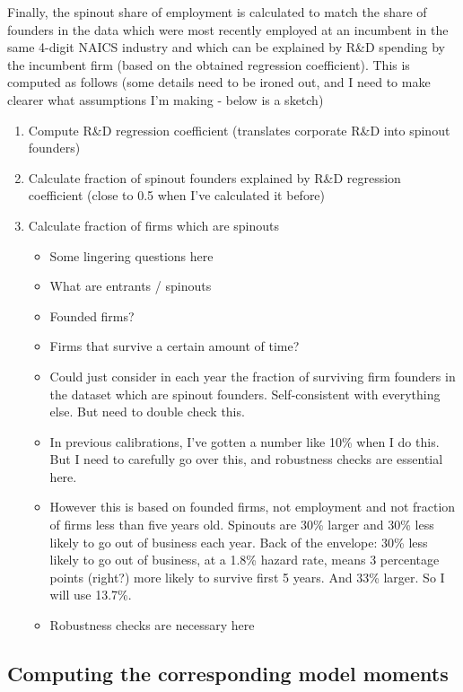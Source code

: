 \documentclass[11pt,english]{article}
\theoremstyle{remark}
\begin{document}
Finally, the spinout share of employment is calculated to match the share of founders in the data which were most recently employed at an incumbent in the same 4-digit NAICS industry and which can be explained by R\&D spending by the incumbent firm (based on the obtained regression coefficient). This is computed as follows (some details need to be ironed out, and I need to make clearer what assumptions I'm making - below is a sketch)

\footnotesize
\begin{enumerate}
	\item Compute R\&D regression coefficient (translates corporate R\&D into spinout founders)
	\item Calculate fraction of spinout founders explained by R\&D regression coefficient (close to 0.5 when I've calculated it before)
	\item Calculate fraction of firms which are spinouts
	\begin{itemize}
		\item Some lingering questions here
		\item What are entrants / spinouts
		\item Founded firms?
		\item Firms that survive a certain amount of time?
		\item Could just consider in each year the fraction of surviving firm founders in the dataset which are spinout founders. Self-consistent with everything else. But need to double check this.
		\item In previous calibrations, I've gotten a number like 10\% when I do this. But I need to carefully go over this, and robustness checks are essential here.
		\item However this is based on founded firms, not employment and not fraction of firms less than five years old. Spinouts are 30\% larger and 30\% less likely to go out of business each year. Back of the envelope: 30\% less likely to go out of business, at a 1.8\% hazard rate, means 3 percentage points (right?) more likely to survive first 5 years. And 33\% larger. So I will use 13.7\%.
		\item Robustness checks are necessary here
	\end{itemize}
\end{enumerate}
\normalsize

\subsection{Computing the corresponding model moments}
\end{document}
